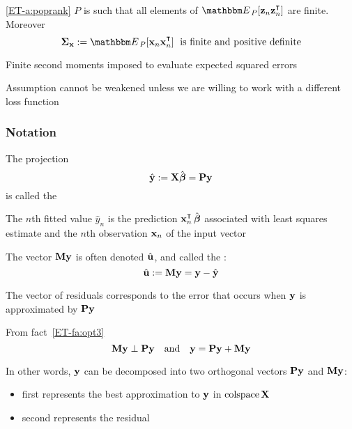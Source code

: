 \begin{frame}
  
    \vspace{2em}
    \Ass\eqref{ET-a:poprank}
    $P$ is such that all elements of $\EE_P [ \boldz_n \boldz_n^\T]$ are finite. 
    Moreover
    \begin{equation}
        \label{eq:smx}
        \Sigmax := \EE_P [ \boldx_n \boldx_n^\T ] \; \text{ is finite and positive definite}
    \end{equation}

    \vspace{.7em}
    Finite second moments imposed to evaluate expected squared errors 
    
    Assumption cannot be weakened unless we are willing to work with a 
    different loss function
\end{frame}

\begin{frame}\frametitle{Notation}
    
    \vspace{2em}
    The projection
    \begin{equation*}
        \hat {\mathbf y} := \mathbf X \hat {\boldsymbol \beta} = \mathbf P {\mathbf y}
    \end{equation*}
    is called the 
    
    The $n$th fitted value $\hat
    y_n$ is the prediction $\boldx_n^\T \, \hboldbeta$ associated with least
    squares estimate
    and the $n$th observation ${\mathbf x}_n$ of the input vector
    
    \vspace{.7em}
    The vector $\mathbf M
    {\mathbf y}$ is often denoted $\hat {\mathbf u}$, and called the :
    \begin{equation*}
        \hat {\mathbf u} := \mathbf M {\mathbf y} = {\mathbf y} - \hat {\mathbf y}
    \end{equation*}
\end{frame}

\begin{frame}

    \vspace{2em}
    The vector of residuals corresponds to the error that occurs when ${\mathbf y}$ is
    approximated by $\mathbf P {\mathbf y}$
    
    From fact~\ref{ET-fa:opt3}
    \begin{equation}
        \label{eq:orr}
        \mathbf M {\mathbf y} \perp \mathbf P {\mathbf y} 
        \quad \text{and} \quad 
        {\mathbf y} =  \mathbf P {\mathbf y} + \mathbf M {\mathbf y}
    \end{equation}
    
    \vspace{.7em}
    In other words, ${\mathbf y}$ can be decomposed into two orthogonal vectors $\mathbf P
    {\mathbf y}$ and $\mathbf M {\mathbf y}$:
    \begin{itemize}
        \item first represents the best approximation
    to ${\mathbf y}$ in $\operatorname{colspace} \mathbf X$
        \item second represents the residual
    \end{itemize}

\end{frame}

